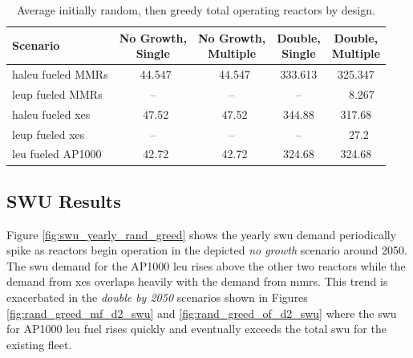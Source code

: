 \begin{table}[H]
    \centering
    \caption{Average initially random, then greedy total operating reactors by design.}
    \label{tab:rand_greed_reac_avg}
    \begin{tabular}{l c c c c}
       \toprule
       Scenario & \shortstack{No Growth,\\ Single} & \shortstack{No Growth,\\ Multiple} & \shortstack{Double,\\ Single} & \shortstack{Double,\\ Multiple}  \\
       \midrule
       \gls{haleu} fueled MMRs      & \textcolor{white}{0}44.547  & \textcolor{white}{0}44.547  & 333.613 & 325.347 \\
       \gls{leup} fueled MMRs       & --      & --      & --      & \textcolor{white}{00}8.267   \\
       \gls{haleu} fueled \gls{xe}s & \textcolor{white}{0}47.52   & \textcolor{white}{0}47.52   & 344.88  & 317.68  \\
       \gls{leup} fueled \gls{xe}s  & --      & --      & --      & \textcolor{white}{0}27.2    \\
       \gls{leu} fueled AP1000      & \textcolor{white}{0}42.72   & \textcolor{white}{0}42.72   & 324.68  & 324.68  \\
       \bottomrule
    \end{tabular}
\end{table}

\subsection{SWU Results}
\label{sec:rand_greed_swu}

Figure \ref{fig:swu_yearly_rand_greed} shows the yearly \gls{swu} demand periodically spike as reactors begin operation in the depicted \textit{no growth} scenario around 2050. The \gls{swu} demand for the AP1000 \gls{leu} rises above the other two reactors while the demand from \glspl{xe} overlaps heavily with the demand from \glspl{mmr}. This trend is exacerbated in the \textit{double by 2050} scenarios shown in Figures \ref{fig:rand_greed_mf_d2_swu} and \ref{fig:rand_greed_of_d2_swu} where the \gls{swu} for AP1000 \gls{leu} fuel rises quickly and eventually exceeds the total \gls{swu} for the existing fleet.

